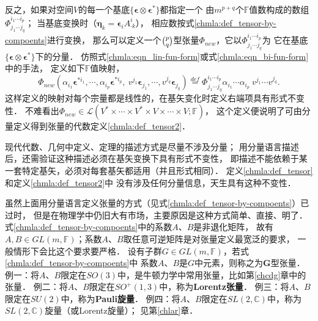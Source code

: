 反之，如果对空间$V$的每一个基底$\{\boldsymbol{\epsilon}\otimes\boldsymbol{\epsilon}^{*}\}$都指定一个
由$m^{p+q}$个$\mathbb{F}$值数构成的数组$\Phi^{i_1 \cdots i_p} _{j_1 \cdots j_q}$；
当基底变换时（$\boldsymbol{\eta}_k = \boldsymbol{\epsilon}_i A_{\cdot k} ^i$），
相应数按式\eqref{chmla:def_tensor-by-compoents}进行变换，
那么可以定义一个$\binom{p}{q}$型张量$\Phi_{new}$，它以$\Phi^{i_1 \cdots i_p} _{j_1 \cdots j_q}$为
它在基底$\{\boldsymbol{\epsilon}\otimes\boldsymbol{\epsilon}^{*}\}$下的分量．
仿照式\eqref{chmla:eqn_lin-fun-form}或式\eqref{chmla:eqn_bi-fun-form}中的手法，
定义如下$\mathbb{F}$值映射，
\begin{equation*}
    \Phi_{new}\left(\alpha_{i_1}\boldsymbol{\epsilon}^{*i_1},\cdots,
      \alpha_{i_p}\boldsymbol{\epsilon}^{*i_p},\
      v^{j_1}\boldsymbol{\epsilon}_{j_1},\cdots,
      v^{j_q}\boldsymbol{\epsilon}_{j_q} \right)
      \overset{def}{=} \Phi^{i_1 \cdots i_p} _{j_1 \cdots j_q}
      \alpha_{i_1}\cdots\alpha_{i_p}\ v^{j_1}\cdots v^{j_q} .
\end{equation*}
这样定义的映射对每个宗量都是线性的，在基矢变化时定义右端项具有形式不变性．
不难看出$\Phi_{new}\in \mathscr{L}(V^* \times \cdots \times V^*
\times V\times \cdots \times V;\mathbb{F})$，
这个定义便说明了可由分量定义得到张量的代数定义\ref{chmla:def_tensor2}．

现代代数、几何中定义、定理的描述方式是尽量不涉及分量；
用分量语言描述后，还需验证这种描述必须在基矢变换下具有形式不变性，
即描述不能依赖于某一套特定基矢，必须对每套基矢都适用（并且形式相同）．
定义\ref{chmla:def_tensor}和定义\ref{chmla:def_tensor2}中
没有涉及任何分量信息，天生具有这种不变性．

虽然上面用分量语言定义张量的方式（见式\eqref{chmla:def_tensor-by-compoents}）已过时，
但是在物理学中仍旧大有市场，主要原因是这种方式简单、直接、明了．
式\eqref{chmla:def_tensor-by-compoents}中的系数$A$、$B$是非退化矩阵，
故有$A,B\in GL(m,\mathbb{F})$；系数$A$、$B$取任意可逆矩阵是对张量定义最宽泛的要求，
一般情形下会比这个要求要严格．
设有子群$G\in GL(m,\mathbb{F})$，若式\eqref{chmla:def_tensor-by-compoents}中
系数$A$、$B$是$G$中元素，则称之为{\heiti $\boldsymbol{G}$型张量．}
{\kaishu 例一}：将$A$、$B$限定在$SO(3)$中，是牛顿力学中常用张量，比如第\ref{chcdg}章中的张量．
{\kaishu 例二}：将$A$、$B$限定在$SO^{+}(1,3)$中，称为{\heiti \bfseries Lorentz张量}．
{\kaishu 例三}：将$A$、$B$限定在$SU(2)$中，称为{\heiti \bfseries Pauli旋量}．
{\kaishu 例四}：将$A$、$B$限定在$SL(2,\mathbb{C})$中，称为$SL(2,\mathbb{C})${\heiti 旋量}（或Lorentz旋量）；
见第\ref{chlar}章．

